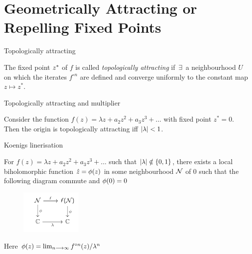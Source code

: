 \section{Geometrically Attracting or Repelling Fixed Points}
\sectiontitleframe

\begin{frame}{Topologically attracting}
    \begin{definition}The fixed point $z^*$ of $f$ is    called \emph{topologically attracting} if\,   $\exists$\, a neighbourhood $U$ on which the iterates ${f}^{\circ n}$ are defined and converge uniformly to the constant map $z \longmapsto z^*$.
    \end {definition}
\end{frame}    
    
\begin{frame}{Topologically attracting and multiplier }
  
        \begin{theorem}
          Consider the function $f(z)=\lambda z+a_{2} z^{2}+a_{3} z^{3}+\dots$ with fixed point $z^*=0$. Then the origin is topologically attracting iff $\left|\lambda\right|<1$.
        \end{theorem}
 
       

\end{frame}
\begin{frame}{Koenigs linerisation}
    \begin{theorem}
    For $ f(z)=\lambda z+a_{2} z^{2}+a_{3} z^{3}+\dots$ such that $\left|\lambda\right| \notin \{0,1\}$, there exists a local biholomorphic function $\hat{z}=\phi(z)$ in some neighbourhood $\mathcal{N}$ of 0 such that the following diagram commute and $\phi (0)=0$ 
    \begin{figure}
    \centering
    \includegraphics[width=3cm]{resources/ch-08/graph1.png}
   
    \end{figure}

    \end{theorem} 
    Here $ \phi(z)=\lim _{n \longrightarrow \infty} f^{\circ n}(z) / \lambda^{n}$
\end{frame}


                    
          

